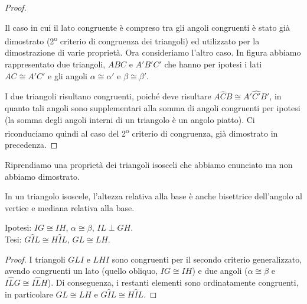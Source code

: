 \begin{proof}
~

\begin{minipage}{.49\textwidth}
  Il caso in cui il lato congruente è compreso tra gli angoli 
  congruenti è stato già dimostrato (2\textsuperscript{o} criterio di 
  congruenza dei triangoli) ed utilizzato per la dimostrazione di varie 
  proprietà. Ora consideriamo l'altro caso.
  In figura abbiamo rappresentato due triangoli, $ABC$ e $A'B'C'$ che 
  hanno per ipotesi i lati $AC\cong A'C'$ e gli angoli $\alpha\cong 
  \alpha'$ e $\beta\cong \beta'$. 
\end{minipage}
\begin{minipage}{.49\textwidth}
 \begin{inaccessibleblock}
    \centering
\end{inaccessibleblock}
\end{minipage}
  I due triangoli risultano congruenti, 
  poiché deve risultare $A\widehat{C}B\cong A'\widehat{C'}B'$, in 
  quanto tali angoli sono supplementari alla somma di angoli congruenti 
  per ipotesi (la somma degli angoli interni di un triangolo è un 
  angolo piatto). Ci riconduciamo quindi al caso del 
  2\textsuperscript{o} criterio di congruenza, già dimostrato in 
  precedenza.
\end{proof}

Riprendiamo una proprietà dei triangoli isosceli che abbiamo 
enunciato ma non abbiamo dimostrato.
\begin{proposizione}
  In un triangolo isoscele, l'altezza relativa alla base è anche 
  bisettrice dell'angolo al vertice e mediana relativa alla base.
\end{proposizione}

\noindent \begin{minipage}{0.6\textwidth}
  \noindent Ipotesi: $IG\cong IH$, $\alpha\cong \beta$, $IL\perp GH$.\\
  Tesi: $G\widehat{I}L\cong H\widehat{I}L$, $GL\cong LH$.
  
  \begin{proof}
    I triangoli $GLI$ e $LHI$ sono congruenti per il secondo criterio 
    generalizzato, avendo congruenti un lato (quello obliquo, $IG\cong 
    IH$) e due angoli ($\alpha\cong \beta$ e $I\widehat{L}G \cong 
    I\widehat{L}H$). Di conseguenza, i restanti elementi sono 
    ordinatamente congruenti, in particolare $GL\cong LH$ e 
    $G\widehat{I}L\cong H\widehat{I}L$.
  \end{proof}
\end{minipage}\hfil
\begin{minipage}{0.4\textwidth}
  \centering
\end{minipage}

